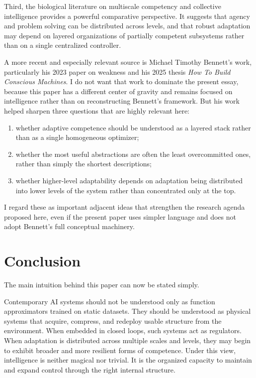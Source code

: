 \documentclass[11pt]{article}
\begin{document}
Third, the biological literature on multiscale competency and collective intelligence provides a powerful comparative perspective. It suggests that agency and problem solving can be distributed across levels, and that robust adaptation may depend on layered organizations of partially competent subsystems rather than on a single centralized controller.

A more recent and especially relevant source is Michael Timothy Bennett's work, particularly his 2023 paper on weakness and his 2025 thesis \textit{How To Build Conscious Machines}. I do not want that work to dominate the present essay, because this paper has a different center of gravity and remains focused on intelligence rather than on reconstructing Bennett's framework. But his work helped sharpen three questions that are highly relevant here:

\begin{enumerate}
\item whether adaptive competence should be understood as a layered stack rather than as a single homogeneous optimizer;
\item whether the most useful abstractions are often the least overcommitted ones, rather than simply the shortest descriptions;
\item whether higher-level adaptability depends on adaptation being distributed into lower levels of the system rather than concentrated only at the top.

\end{enumerate}

I regard these as important adjacent ideas that strengthen the research agenda proposed here, even if the present paper uses simpler language and does not adopt Bennett's full conceptual machinery.

\section{Conclusion}


The main intuition behind this paper can now be stated simply.

Contemporary AI systems should not be understood only as function approximators trained on static datasets. They should be understood as physical systems that acquire, compress, and redeploy usable structure from the environment. When embedded in closed loops, such systems act as regulators. When adaptation is distributed across multiple scales and levels, they may begin to exhibit broader and more resilient forms of competence. Under this view, intelligence is neither magical nor trivial. It is the organized capacity to maintain and expand control through the right internal structure.
\end{document}
